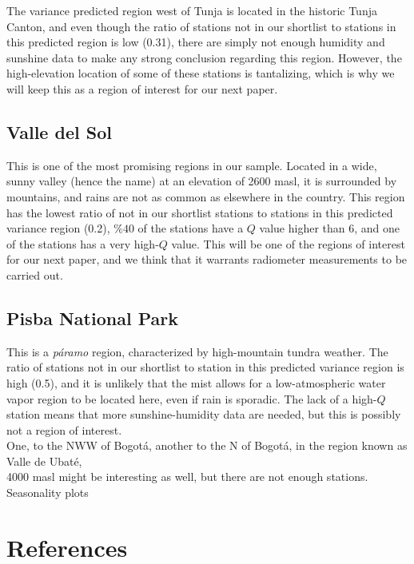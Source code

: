 \documentclass[12pt]{iopart}
\begin{document}
The variance predicted region west of Tunja is located in the historic Tunja Canton, and even though the ratio of stations not in our shortlist to stations in this predicted region is low (0.31), there are simply not enough humidity and sunshine data to make any strong conclusion regarding this region. However, the high-elevation location of some of these stations is tantalizing, which is why we will keep this as a region of interest for our next paper.


\subsection{Valle del Sol}

This is one of the most promising regions in our sample. Located in a wide, sunny valley (hence the name) at an elevation of 2600 masl, it is surrounded by mountains, and rains are not as common as elsewhere in the country. This region has the lowest ratio of not in our shortlist stations to stations in this predicted variance region (0.2), $\%40$ of the stations have a $Q$ value higher than 6, and one of the stations has a very high-$Q$ value. This will be one of the regions of interest for our next paper, and we think that it warrants radiometer measurements to be carried out.

\subsection{Pisba National Park}

This is a \emph{p\'aramo} region, characterized by high-mountain tundra weather. The ratio of stations not in our shortlist to station in this predicted variance region is high (0.5), and it is unlikely that the mist allows for a low-atmospheric water vapor region to be located here, even if rain is sporadic. The lack of a high-$Q$ station means that more sunshine-humidity data are needed, but this is possibly not a region of interest.\\



One, to the NWW of Bogot\'a, another to the N of Bogot\'a, in the region known as Valle de Ubat\'e, \\

4000 masl might be interesting as well, but there are not enough stations.\\

Seasonality plots\\

 


  

 \section*{References}
 

  
  
\end{document}
